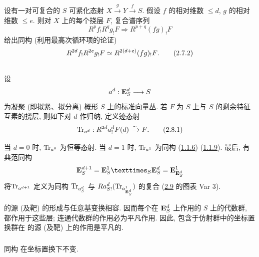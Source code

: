 \setcounter{subsection}{6}
\subsection{}
设有一对可复合的 $S$ 可紧化态射 $X\xrightarrow{g} Y\xrightarrow{f}S$. 假设 $f$ 的相对维数 $\leq d$, $g$ 的相对维数 $\leq
e$. 则对 $X$ 上的每个挠层 $F$, 复合谱序列
\begin{equation*}
R^{p}f_{!}R^{q}g_{!}F\Longrightarrow R^{p+q}(fg)_{!}F\tag{2.7.1}
\end{equation*}%
给出同构 (利用最高次循环项的论证)
\begin{equation*}
R^{2d}f_{!}R^{2e}g_{!}F\simeq R^{2(d+e)}(fg)_{!}F{}.\tag{2.7.2}
\end{equation*}

\subsection{}
设
$$
a^{d}:\mathbf{E}^{d}_{S}\longrightarrow S
$$
为凝聚 (即拟紧、拟分离) 概形 $S$ 上的标准向量丛. 若 $F$ 为 $S$ 上与 $S$ 的剩余特征互素的挠层, 则如下对 $d$ 作归纳, 定义迹态射
\begin{equation*}
\operatorname{Tr}_{a^d}:R^{2d}a^{d}_{!}F(d)\xrightarrow{\sim} F{}.\tag{2.8.1}
\end{equation*}

当 $d=0$ 时, $\operatorname{Tr}_{a^0}$ 为恒等态射. 当 $d=1$ 时, $\operatorname{Tr}_{a^1}$ 为同构 (\hyperref[XVIII.prop1.1.6]{1.1.6}) (\cf \hyperref[XVIII.lem1.1.9]{1.1.9}). 最后, 有典范同构
$$
\EE^{d+1}_{S}=\fprod{\EE^{1}_{S}}{\EE^{d}_{S}}{S}=\EE^{1}_{\EE_{S}^d}
$$
将\pageoriginale $\operatorname{Tr}_{a^{d+1}}$ 定义为同构 $\operatorname{Tr}_{a^{d}_{S}}$ 与
$Ra^{d}_{S!}(\operatorname{Tr}_{a^1_{\mathbf{E}^d_S}})$
的复合 (\cf \hyperref[XVIII.thm2.9]{2.9} 的图表 Var 3).

 的源 (及靶) 的形成与任意基变换相容. 因而每个在 $\mathbf{E}^{d}_{S}$ 上作用的 $S$ 上的代数群, 都作用于这些层; 连通代数群的作用必为平凡作用. 因此, 包含于仿射群中的坐标置换群在  的源 (及靶) 上的作用是平凡的.

\setcounter{subsubsection}{1}
\subsubsection{}
同构  在坐标置换下不变.

